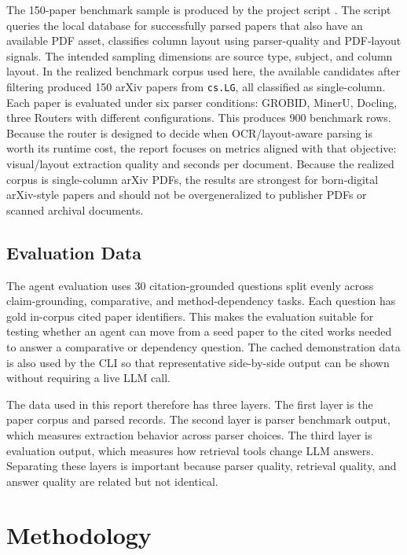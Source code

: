 \documentclass[10pt]{article}
\begin{document}
The 150-paper benchmark sample is produced by the project script . The script queries the local database for successfully parsed papers that also have an available PDF asset, classifies column layout using parser-quality and PDF-layout signals. The intended sampling dimensions are source type, subject, and column layout. In the realized benchmark corpus used here, the available candidates after filtering produced 150 arXiv papers from \texttt{cs.LG}, all classified as single-column. Each paper is evaluated under six parser conditions: GROBID, MinerU, Docling, three Routers with different configurations. This produces 900 benchmark rows. Because the router is designed to decide when OCR/layout-aware parsing is worth its runtime cost, the report focuses on metrics aligned with that objective: visual/layout extraction quality and seconds per document. Because the realized corpus is single-column arXiv PDFs, the results are strongest for born-digital arXiv-style papers and should not be overgeneralized to publisher PDFs or scanned archival documents.

\subsection{Evaluation Data}

The agent evaluation uses 30 citation-grounded questions split evenly across claim-grounding, comparative, and method-dependency tasks. Each question has gold in-corpus cited paper identifiers. This makes the evaluation suitable for testing whether an agent can move from a seed paper to the cited works needed to answer a comparative or dependency question. The cached demonstration data is also used by the CLI so that representative side-by-side output can be shown without requiring a live LLM call.

The data used in this report therefore has three layers. The first layer is the paper corpus and parsed records. The second layer is parser benchmark output, which measures extraction behavior across parser choices. The third layer is evaluation output, which measures how retrieval tools change LLM answers. Separating these layers is important because parser quality, retrieval quality, and answer quality are related but not identical.

\section{Methodology}
\end{document}
